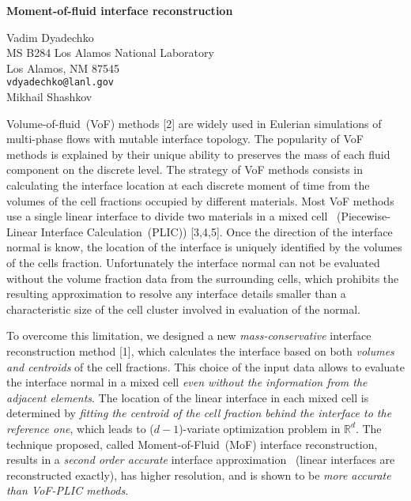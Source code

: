 \documentclass[twosided]{report}
\newcommand{\Reals}{\mathbb{R}}
\begin{document}
\begin{center}
{\large			%
{\bf Moment-of-fluid interface reconstruction}}

	Vadim Dyadechko \\
	MS B284 Los Alamos National Laboratory \\
	Los Alamos, NM 87545 \\
	{\tt vdyadechko@lanl.gov} \\
	Mikhail Shashkov
\end{center}
Volume-of-fluid~(VoF) methods [2] are widely used in
Eulerian simulations of multi-phase flows with mutable
interface topology. The popularity of VoF methods is
explained by their unique ability to preserves the mass of
each fluid component on the discrete level. The strategy of
VoF methods consists in calculating the interface location
at each discrete moment of time from the volumes of the cell
fractions occupied by different materials. Most VoF methods
use a single linear interface to divide two materials in a
mixed cell ~(Piecewise-Linear Interface Calculation~(PLIC))
[3,4,5]. Once the direction of the interface normal is know,
the location of the interface is uniquely identified by the
volumes of the cells fraction. Unfortunately the interface
normal can not be evaluated without the volume fraction data
from the surrounding cells, which prohibits the resulting
approximation to resolve any interface details smaller than
a characteristic size of the cell cluster involved in
evaluation of the normal.

To overcome this limitation, we
designed a new \emph{mass-conservative} interface
reconstruction method [1], which calculates the interface
based on both \emph{volumes and centroids} of the cell
fractions. This choice of the input data allows to evaluate
the interface normal in a mixed cell \emph{even without the
information from the adjacent elements}. The location of the
linear interface in each mixed cell is determined by
\emph{fitting the centroid of the cell fraction behind the
interface to the reference one}, which leads to
($d\!-\!1$)-variate optimization problem in $\Reals^d$. The
technique proposed, called Moment-of-Fluid~(MoF) interface
reconstruction, results in a \emph{second order accurate}
interface approximation~ (linear interfaces are
reconstructed exactly), has higher resolution, and is shown
to be \emph{more accurate than VoF-PLIC methods}.
\end{document}
